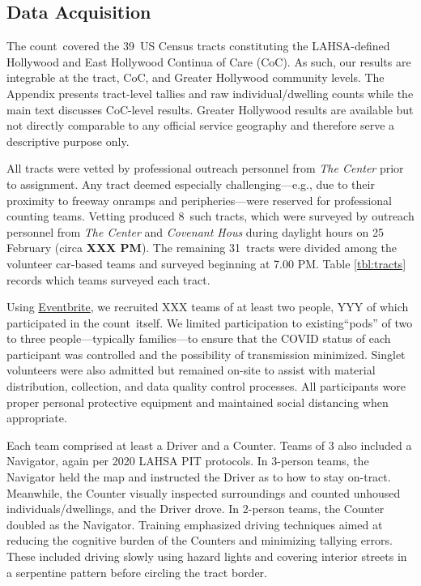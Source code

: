 \documentclass[11pt,twocolumn]{article}
\def\bfr{\bf\color{red}}
\def\Count{count}
\def\ntracts{39}
\def\nprof{8}
\def\nvol{31}
\begin{document}
\subsection{Data Acquisition}
\label{sec:acquisition}

The \Count\ covered the \ntracts\ US Census tracts constituting the LAHSA-defined Hollywood 
and East Hollywood Continua of Care (CoC). As such, our results are integrable at the tract, CoC, 
and Greater Hollywood community levels. The Appendix presents tract-level tallies and raw
individual/dwelling counts while the main text discusses CoC-level results. Greater Hollywood 
results are available but not directly comparable to any official service geography and therefore
serve a descriptive purpose only.

All tracts were vetted by professional outreach personnel from {\it The Center} prior to assignment. 
Any tract deemed especially challenging---e.g., due to their proximity to freeway onramps and 
peripheries---were reserved for professional counting teams. Vetting produced \nprof\ such tracts,
which were surveyed by outreach personnel from {\it The Center} and {\it Covenant Hous} during 
daylight hours on 25 February (circa {\bfr XXX PM}). The remaining \nvol\ tracts were divided 
among the volunteer car-based teams and surveyed beginning at 7.00 PM. Table \ref{tbl:tracts} 
records which teams surveyed each tract.

Using \href{http://www.eventbrite.com}{Eventbrite}, we recruited XXX teams of at least two people, 
YYY of which participated in the \Count\ itself. We limited participation to existing``pods'' of two to 
three people---typically families---to ensure that the COVID status of each participant was controlled 
and the possibility of transmission minimized. Singlet volunteers were also admitted but remained 
on-site to assist with material distribution, collection, and data quality control processes. All participants 
wore proper personal protective equipment and maintained social distancing when appropriate.

Each team comprised at least a Driver and a Counter. Teams of 3 also included a Navigator, again per
2020 LAHSA PIT protocols. In 3-person teams, the Navigator held the map and instructed the Driver 
as to how to stay on-tract. Meanwhile, the Counter visually inspected surroundings and counted unhoused 
individuals/dwellings, and the Driver drove. In 2-person teams, the Counter doubled as the Navigator. 
Training emphasized driving techniques aimed at reducing the cognitive burden of the Counters and 
minimizing tallying errors. These included driving slowly using hazard lights and covering interior streets 
in a serpentine pattern before circling the tract border.
\end{document}
